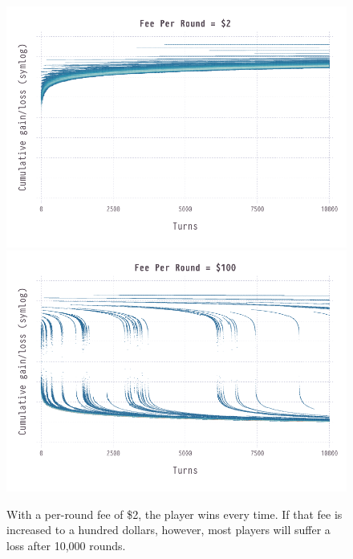 \documentclass{article}
\begin{document}
\begin{figure}[htb]
  \centering
  \includegraphics[width=\textwidth]{winnings-2}
  \includegraphics[width=\textwidth]{winnings-100}
  
  \caption{With a per-round fee of \$2, the player wins every time. If that fee is increased to a hundred dollars, however, most players will suffer a loss after 10,000 rounds.}
  \label{fig:evolution}
\end{figure}\label{fig:payout_p}
\end{document}

